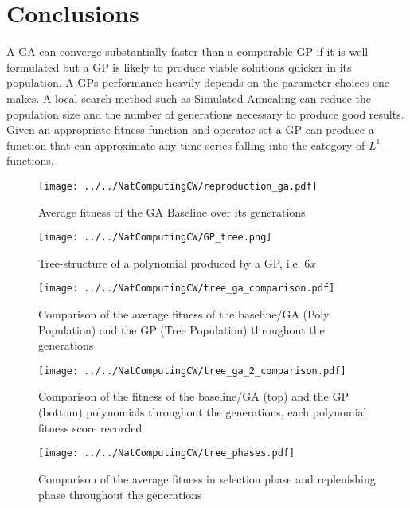 \documentclass[11pt,a4paper]{article}
\begin{document}
\section*{Conclusions}
A GA can converge substantially faster than a comparable GP if it is well formulated but a GP is likely to produce viable solutions quicker in its population. A GPs performance heavily depends on the parameter choices one makes. A local search method such as Simulated Annealing can reduce the population size and the number of generations necessary to produce good results.
Given an appropriate fitness function and operator set a GP can produce a function that can approximate any time-series falling into the category of $L^1$-functions.

\begin{appendices}
\begin{figure}[h]
\centering
\texttt{[image: ../../NatComputingCW/reproduction\_ga.pdf]} 
\caption{Average fitness of the GA Baseline over its generations}
\label{fig:baseline}
\end{figure}

\begin{figure}[h]
\centering
\texttt{[image: ../../NatComputingCW/GP\_tree.png]} 
\caption{Tree-structure of a polynomial produced by a GP, i.e. $6x$}
\label{fig:syntax_tree}
\end{figure}

\begin{figure}[h]
\centering
\texttt{[image: ../../NatComputingCW/tree\_ga\_comparison.pdf]} 
\caption{Comparison of the average fitness of the baseline/GA (Poly Population) and the GP (Tree Population) throughout the generations}
\label{fig:tree_ga_comparison}
\end{figure}

\begin{figure}[h]
\centering
\texttt{[image: ../../NatComputingCW/tree\_ga\_2\_comparison.pdf]} 
\caption{Comparison of the fitness of the baseline/GA (top) and the GP (bottom) polynomials throughout the generations, each polynomial fitness score recorded}
\label{fig:tree_ga_comparison_2}
\end{figure}

\begin{figure}[h]
\centering
\texttt{[image: ../../NatComputingCW/tree\_phases.pdf]} 
\caption{Comparison of the average fitness in selection phase and replenishing phase throughout the generations}
\label{fig:tree_phases}
\end{figure}


\end{appendices}
\end{document}
